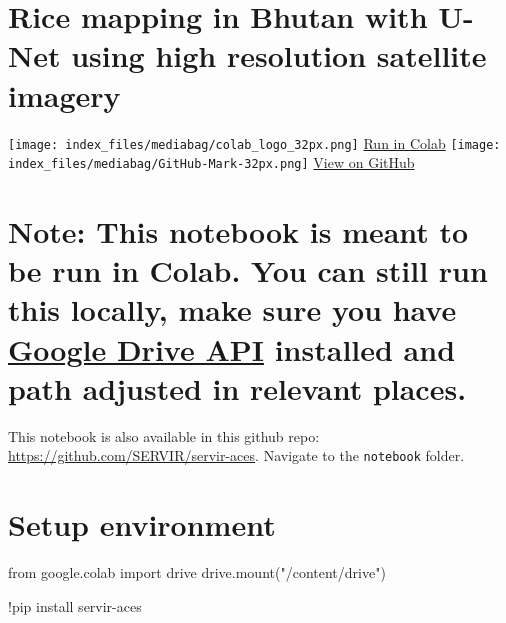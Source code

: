 \documentclass[
  letterpaper,
  DIV=11,
  numbers=noendperiod]{scrreprt}
\newenvironment{Shaded}{\begin{snugshade}}{\end{snugshade}}
\newcommand{\ImportTok}[1]{\textcolor[rgb]{0.00,0.46,0.62}{#1}}
\newcommand{\NormalTok}[1]{\textcolor[rgb]{0.00,0.23,0.31}{#1}}
\newcommand{\OperatorTok}[1]{\textcolor[rgb]{0.37,0.37,0.37}{#1}}
\newcommand{\StringTok}[1]{\textcolor[rgb]{0.13,0.47,0.30}{#1}}
\begin{document}
\section{Rice mapping in Bhutan with U-Net using high resolution
satellite
imagery}\label{rice-mapping-in-bhutan-with-u-net-using-high-resolution-satellite-imagery}

\texttt{[image: index\_files/mediabag/colab\_logo\_32px.png]}
\href{https://colab.research.google.com/github/SERVIR/SERVIR-Applied-Deep-Learning-Book/blob/main/03_Semantic_Segmentation/01__Crop_Mapping/notebooks/Rice_Mapping_Bhutan_2021.ipynb}{Run
in Colab} \texttt{[image: index\_files/mediabag/GitHub-Mark-32px.png]}
\href{https://github.com/SERVIR/SERVIR-Applied-Deep-Learning-Book/blob/main/03_Semantic_Segmentation/01__Crop_Mapping/notebooks/Rice_Mapping_Bhutan_2021.ipynb}{View
on GitHub}

\section{\texorpdfstring{Note: This notebook is meant to be run in
Colab. You can still run this locally, make sure you have
\href{https://developers.google.com/workspace/drive/api/quickstart/python}{Google
Drive API} installed and path adjusted in relevant
places.}{Note: This notebook is meant to be run in Colab. You can still run this locally, make sure you have Google Drive API installed and path adjusted in relevant places.}}\label{note-this-notebook-is-meant-to-be-run-in-colab.-you-can-still-run-this-locally-make-sure-you-have-google-drive-api-installed-and-path-adjusted-in-relevant-places.}

This notebook is also available in this github repo:
\url{https://github.com/SERVIR/servir-aces}. Navigate to the
\texttt{notebook} folder.

\section{Setup environment}\label{setup-environment}

\begin{Shaded}
\begin{Highlighting}[]
\ImportTok{from}\NormalTok{ google.colab }\ImportTok{import}\NormalTok{ drive}
\NormalTok{drive.mount(}\StringTok{"/content/drive"}\NormalTok{)}
\end{Highlighting}
\end{Shaded}

\begin{Shaded}
\begin{Highlighting}[]
\OperatorTok{!}\NormalTok{pip install servir}\OperatorTok{{-}}\NormalTok{aces}
\end{Highlighting}
\end{Shaded}
\end{document}
